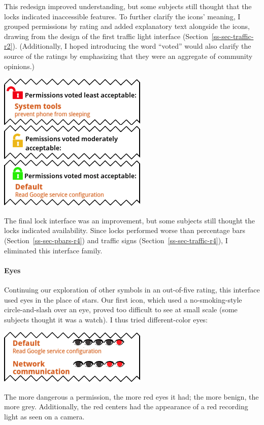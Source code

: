 \documentclass[11pt]{article}
\newcommand{\refsec}[1]{Section~\ref{#1}}
\begin{document}
This redesign improved understanding, but 
some subjects still thought that the locks indicated inaccessible features.
To further clarify the icons' meaning, I grouped 
permissions by rating and added explanatory 
text alongside the icons, drawing 
from the design of the first traffic light interface 
(\refsec{ss-sec-traffic-r2}).
(Additionally, I hoped introducing the word ``voted'' 
would also clarify the source of the ratings by emphasizing that they 
were an aggregate of community opinions.)
\label{ss-sec-locks-r4}
\begin{center}
\includegraphics[width=.5\linewidth]{candidate-img/locks/locksR4.png}
\end{center}
The final lock interface was an improvement, 
but some subjects still thought the locks indicated 
availability. Since locks 
performed worse than percentage bars (\refsec{ss-sec-pbars-r4}) 
and traffic signs (\refsec{ss-sec-traffic-r4}), 
I eliminated this interface family.



\paragraph{Eyes}
\label{s-sec-eyes}

Continuing our exploration of other symbols in an out-of-five rating, this 
interface used eyes in the place of stars. Our first icon, which
used a no-smoking-style circle-and-slash over an eye, 
proved too difficult to see at small scale
(some subjects thought it was a watch). I thus tried different-color eyes:
\label{ss-sec-eyes-r2}
\begin{center}
\includegraphics[width=.5\linewidth]{candidate-img/eyes/eyesR2.png}
\end{center}
The more dangerous a permission, the more red eyes it had; the more
benign, the more grey.
Additionally, the red centers had 
the appearance of a red recording light as seen on a camera.
\end{document}
